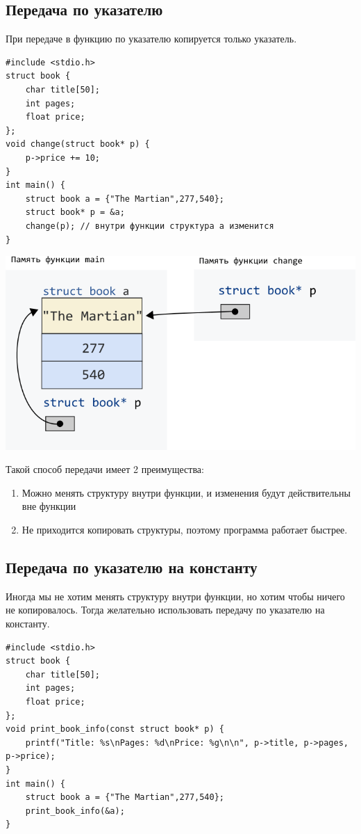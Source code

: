 \documentclass{article}
\begin{document}
\subsection*{Передача по указателю}
При передаче в функцию по указателю копируется только указатель.
\begin{lstlisting}
#include <stdio.h>
struct book {
    char title[50];
    int pages;
    float price;
};
void change(struct book* p) {
    p->price += 10;
}
int main() {
    struct book a = {"The Martian",277,540};
    struct book* p = &a;
    change(p); // внутри функции структура a изменится
}
\end{lstlisting}
\begin{center}
\includegraphics[scale=0.6]{../images/structpassbypointer.png}
\end{center}
Такой способ передачи имеет 2 преимущества:
\begin{enumerate}
\item Можно менять структуру внутри функции, и изменения будут действительны вне функции
\item Не приходится копировать структуры, поэтому программа работает быстрее.
\end{enumerate}

\subsection*{Передача по указателю на константу}
Иногда мы не хотим менять структуру внутри функции, но хотим чтобы ничего не копировалось. Тогда желательно использовать передачу по указателю
на константу.
\begin{lstlisting}
#include <stdio.h>
struct book {
    char title[50];
    int pages;
    float price;
};
void print_book_info(const struct book* p) {
    printf("Title: %s\nPages: %d\nPrice: %g\n\n", p->title, p->pages, p->price);
}
int main() {
    struct book a = {"The Martian",277,540};
    print_book_info(&a);
}
\end{lstlisting}
\newpage
\end{document}
